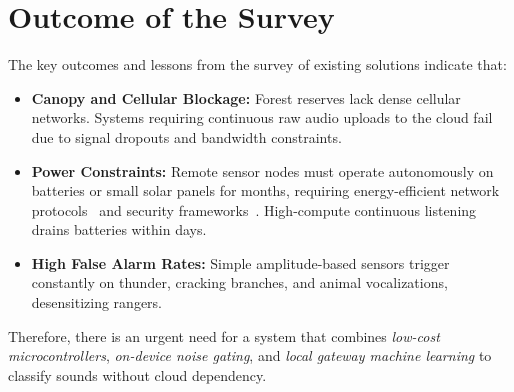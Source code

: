 \documentclass[11pt,a4paper,oneside]{report}
\begin{document}
\section{Outcome of the Survey}
The key outcomes and lessons from the survey of existing solutions indicate that:
\begin{itemize}
    \item \textbf{Canopy and Cellular Blockage:} Forest reserves lack dense cellular networks. Systems requiring continuous raw audio uploads to the cloud fail due to signal dropouts and bandwidth constraints.
    \item \textbf{Power Constraints:} Remote sensor nodes must operate autonomously on batteries or small solar panels for months, requiring energy-efficient network protocols~\cite{ref_heinzelman} and security frameworks~\cite{ref_bahi}. High-compute continuous listening drains batteries within days.
    \item \textbf{High False Alarm Rates:} Simple amplitude-based sensors trigger constantly on thunder, cracking branches, and animal vocalizations, desensitizing rangers.
\end{itemize}
Therefore, there is an urgent need for a system that combines \emph{low-cost microcontrollers}, \emph{on-device noise gating}, and \emph{local gateway machine learning} to classify sounds without cloud dependency.
\end{document}
